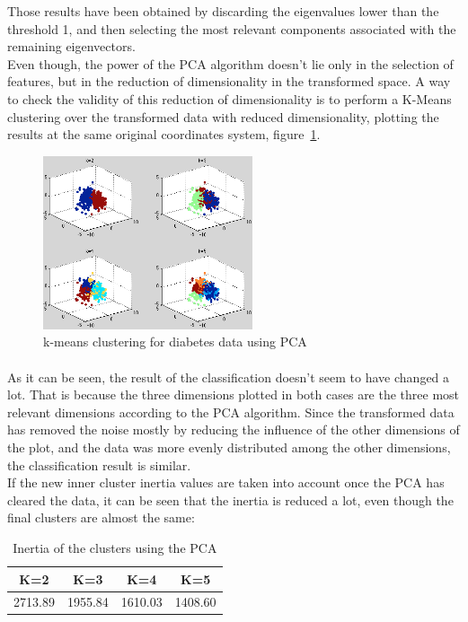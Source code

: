 \documentclass[12pt, a4paper]{article}
\begin{document}
Those results have been obtained by discarding the eigenvalues lower than the threshold 1, and then selecting the most relevant components associated with the remaining eigenvectors.\\

Even though, the power of the PCA algorithm doesn't lie only in the selection of features, but in the reduction of dimensionality in the transformed space. A way to check the validity of this reduction of dimensionality is to perform a K-Means clustering over the transformed data with reduced dimensionality, plotting the results at the same original coordinates system, figure~\ref{fig:diabetes_2}.
\begin{figure}[ht!]
	\centering
	\includegraphics[width=0.55\textwidth]{img/Diabetes_2}
	\caption{k-means clustering for diabetes data using PCA}
	\label{fig:diabetes_2}
\end{figure}
\paragraph{}As it can be seen, the result of the classification doesn't seem to have changed a lot. That is because the three dimensions plotted in both cases are the three most relevant dimensions according to the PCA algorithm. Since the transformed data has removed the noise mostly by reducing the influence of the other dimensions of the plot, and the data was more evenly distributed among the other dimensions, the classification result is similar.\\

If the new inner cluster inertia values are taken into account once the PCA has cleared the data, it can be seen that the inertia is reduced a lot, even though the final clusters are almost the same:
\begin{table}[ht!]
	\centering
	\begin{tabular}{|c|c|c|c|}
		\hline
		\rowcolor[gray]{0.85} \textbf{K=2}&\textbf{K=3}&\textbf{K=4}&\textbf{K=5}\\\hline
		2713.89&1955.84&1610.03&1408.60\\\hline
	\end{tabular}
	\label{tab:diabetesPCA}
	\caption{Inertia of the clusters using the PCA}
\end{table}
\end{document}
